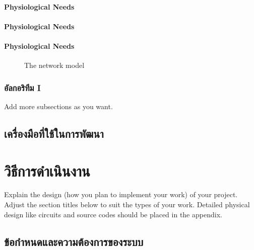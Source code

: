 \documentclass[12pt,oneside,openright,a4paper]{cpe-thai-project}
\begin{document}
\subsubsection{Physiological Needs}
\subsubsection{Physiological Needs}
\subsubsection{Physiological Needs}





\begin{figure}[!h]\centering
\setlength{\fboxrule}{0.2mm} %
\setlength{\fboxsep}{1cm}
\caption{The network model}\label{fig:model2}
\end{figure}

 
\subsection{อัลกอริทึม I}
Add more subsections as you want.


\section{เครื่องมือที่ใช้ในการพัฒนา}

\chapter{วิธีการดำเนินงาน}

Explain the design (how you plan to implement your work) of your project. Adjust the section titles below to suit the types of your work. Detailed physical design like circuits and source codes should be placed in the appendix.

\section{ข้อกำหนดและความต้องการของระบบ}
\end{document}

